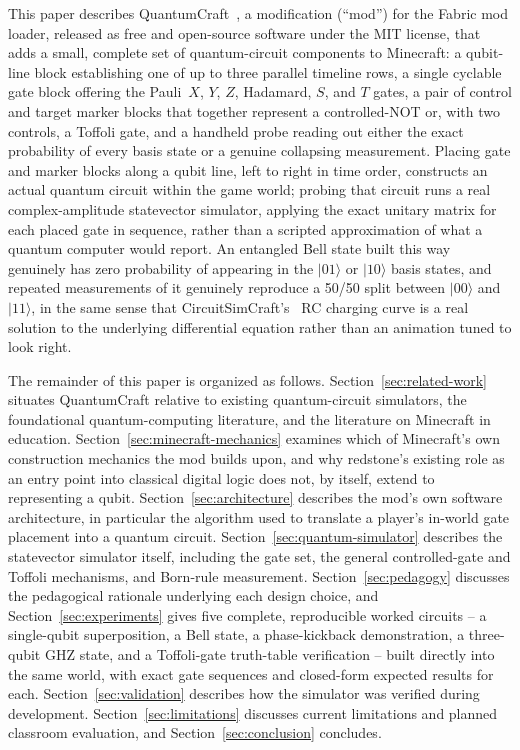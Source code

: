This paper describes QuantumCraft~\cite{picos2026quantumcraft}, a modification (``mod'') for
the Fabric mod loader, released as free and open-source software under the MIT license, that
adds a small, complete set of quantum-circuit components to Minecraft: a qubit-line block
establishing one of up to three parallel timeline rows, a single cyclable gate block offering
the Pauli~$X$, $Y$, $Z$, Hadamard, $S$, and $T$ gates, a pair of control and target marker
blocks that together represent a controlled-NOT or, with two controls, a Toffoli gate, and a
handheld probe reading out either the exact probability of every basis state or a genuine
collapsing measurement. Placing gate and marker blocks along a qubit line, left to right in
time order, constructs an actual quantum circuit within the game world; probing that circuit
runs a real complex-amplitude statevector simulator, applying the exact unitary matrix for
each placed gate in sequence, rather than a scripted approximation of what a quantum computer
would report. An entangled Bell state built this way genuinely has zero probability of
appearing in the $|01\rangle$ or $|10\rangle$ basis states, and repeated measurements of it
genuinely reproduce a 50/50 split between $|00\rangle$ and $|11\rangle$, in the same sense
that CircuitSimCraft's~\cite{picos2026circuitsimcraft} RC charging curve is a real solution to the
underlying differential equation rather than an animation tuned to look right.

The remainder of this paper is organized as follows. Section~\ref{sec:related-work}
situates QuantumCraft relative to existing quantum-circuit simulators, the foundational
quantum-computing literature, and the literature on Minecraft in education.
Section~\ref{sec:minecraft-mechanics} examines which of Minecraft's own construction
mechanics the mod builds upon, and why redstone's existing role as an entry point into
classical digital logic does not, by itself, extend to representing a qubit.
Section~\ref{sec:architecture} describes the mod's own software architecture, in particular
the algorithm used to translate a player's in-world gate placement into a quantum circuit.
Section~\ref{sec:quantum-simulator} describes the statevector simulator itself, including the
gate set, the general controlled-gate and Toffoli mechanisms, and Born-rule measurement.
Section~\ref{sec:pedagogy} discusses the pedagogical rationale underlying each design choice,
and Section~\ref{sec:experiments} gives five complete, reproducible worked circuits -- a
single-qubit superposition, a Bell state, a phase-kickback demonstration, a three-qubit GHZ
state, and a Toffoli-gate truth-table verification -- built directly into the same world,
with exact gate sequences and closed-form expected results for each.
Section~\ref{sec:validation} describes how the simulator was verified during development.
Section~\ref{sec:limitations} discusses current limitations and planned classroom
evaluation, and Section~\ref{sec:conclusion} concludes.
